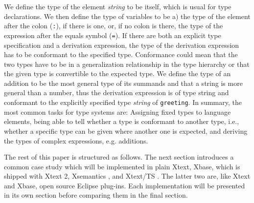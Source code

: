 We define the type of the element \emph{string} to be itself, which is usual for
type declarations. We then define the type of variables to be a) the type of the
element after the colon (\verb|:|), if there is one, or, if no colon is there,
the type of the expression after the equals symbol (\verb|=|).
If there are both an explicit type specification and a derivation expression,
the type of the derivation expression has to be conformant to the specified
type. Conformance could mean that the two types have to be in a generalization
relationship in the type hierarchy or that the given type is convertible to the
expected type. We define the type of an addition to be the most general type of
its summands and that a string is more general than a number, thus the
derivation expression is of type string and conformant to the explicitly
specified type \emph{string} of \verb|greeting|. In summary, the most common
tasks for type systems are:
Assigning fixed types to language elements, being able to tell whether a
type is conformant to another type, i.e., whether a specific type can be given
where another one is expected, and deriving the types of complex expressions, e.g.
additions.

The rest of this paper is structured as follows. The next section introduces a
common case study which will be implemented in plain Xtext, Xbase, which is
shipped with Xtext 2, Xsemantics \cite{lbts}, and Xtext/TS \cite{mvts}. The
latter two are, like Xtext and Xbase, open source Eclipse plug-ins. Each
implementation will be presented in its own section before comparing them in
the final section.
